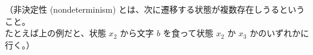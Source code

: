 \documentclass[
		head_space=20mm,
		foot_space=20mm,
		gutter=10mm,
		line_length=190mm
]{jlreq}
\begin{document}
\begin{example}
	\vspace{5pt}
	（非決定性 (nondeterminism) とは、次に遷移する状態が複数存在しうるということ。\\たとえば上の例だと、状態 $x_2$ から文字 $b$ を食って状態 $x_2$ か $x_3$ かのいずれかに行く。）
\end{example}

\clearpage
\end{document}
